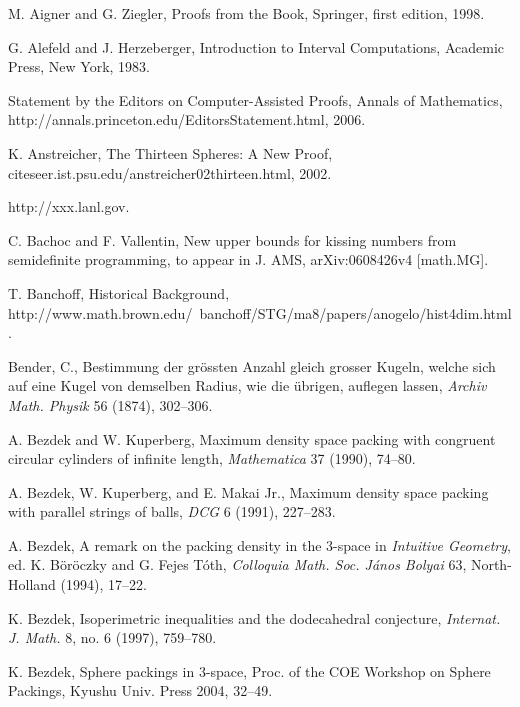 


\begin{thebibliography}{CHMS94}

 M. Aigner and G. Ziegler, Proofs from the Book,
Springer, first edition, 1998.

 G. Alefeld and J. Herzeberger, Introduction
    to Interval Computations, Academic Press, New York, 1983.

  Statement by the Editors on Computer-Assisted Proofs,
Annals of Mathematics,
http://annals.princeton.edu/EditorsStatement.html, 2006.

  K. Anstreicher, The Thirteen Spheres: A New Proof,
citeseer.ist.psu.edu/anstreicher02thirteen.html, 2002.

 http://xxx.lanl.gov.



  C. Bachoc and F. Vallentin, New upper bounds
for kissing numbers from semidefinite programming, to appear in J. AMS,
arXiv:0608426v4 [math.MG].

 T. Banchoff, Historical Background,
http://www.math.brown.edu/~banchoff/STG/ma8/papers/anogelo/hist4dim.html.


  Bender, C., Bestimmung der gr\"ossten Anzahl gleich
grosser Kugeln, welche sich auf eine Kugel von demselben Radius,
wie die \"ubrigen, auflegen lassen, {\it Archiv Math. Physik} 56
(1874), 302--306.

 A. Bezdek and W. Kuperberg, Maximum density space packing with
    congruent circular cylinders of infinite length,
    {\it Mathematica} 37 (1990), 74--80.

 A. Bezdek, W. Kuperberg, and E. Makai Jr., Maximum density
    space packing with parallel strings of balls,
    {\it DCG} 6 (1991), 227--283.

 A. Bezdek, A remark on the packing density in the 3-space
    in {\it Intuitive Geometry}, ed. K. B\"or\"oczky and G. Fejes
    T\'oth, {\it Colloquia Math. Soc. J\'anos Bolyai} 63, North-Holland
    (1994), 17--22.

 K. Bezdek, Isoperimetric inequalities and the dodecahedral
    conjecture, {\it Internat. J. Math.} 8, no. 6 (1997), 759--780.

 K. Bezdek, Sphere packings in $3$-space,
Proc. of the COE Workshop on Sphere Packings, Kyushu Univ. Press 2004, 32--49.


\end{thebibliography}
